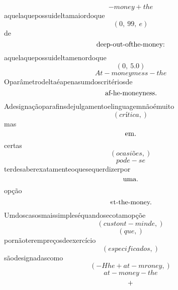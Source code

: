 \documentclass{article}
\begin{document}
\begin{equation}
- money + the
\end{equation}aquelaquepossuideltamaiordoque\begin{equation}
\left( 0, \  99, \  e\right)
\end{equation}de\begin{equation}
$deep-out-ofthe-money:$
\end{equation}aquelaquepossuideltamenordoque\begin{equation}
\left( 0, \  5.0\right)
\end{equation}\begin{equation}
At - moneymess - the
\end{equation}Oparâmetrodeltaéapenasumdoscritériosde\begin{equation}
$af-he-moneyness.$
\end{equation}Adesignaçãoparafinsdejulgamentoelinguagemnãoémuito\begin{equation}
\left( crítica,\right)
\end{equation}mas\begin{equation}
$em.$
\end{equation}certas\begin{equation}
\left( ocasiões,\right)
\end{equation}\begin{equation}
pode - se
\end{equation}terdesaberexatamenteoquesequerdizerpor\begin{equation}
$uma.$
\end{equation}opção\begin{equation}
$«t-the-money.$
\end{equation}Umdoscasosmaissimpleséquandosecotamopçõe\begin{equation}
\left( custont - minde,\right)
\end{equation}\begin{equation}
\left( que,\right)
\end{equation}pornãoterempreçosdeexercício\begin{equation}
\left( especificados,\right)
\end{equation}sãodesignadascomo\begin{equation}
\left( - Hhe + at - mroney,\right)
\end{equation}\begin{equation}
at - money - the
\end{equation}\begin{equation}
$+$
\end{equation}\begin{equation}

\end{equation}
\end{document}
